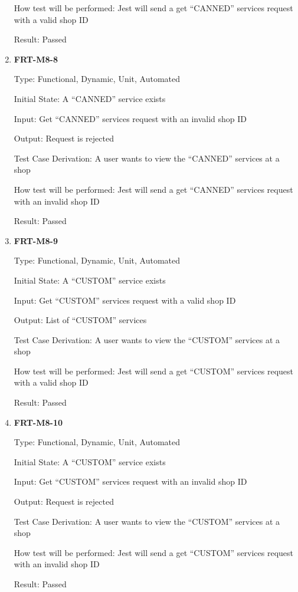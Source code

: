 \documentclass[12pt, titlepage]{article}
\begin{document}
\begin{enumerate}
	      How test will be performed: Jest will send a get ``CANNED'' services request with a valid shop ID

	      Result: Passed

	\item \textbf{FRT-M8-8}

	      Type: Functional, Dynamic, Unit, Automated

	      Initial State: A ``CANNED'' service exists

	      Input: Get ``CANNED'' services request with an invalid shop ID

	      Output: Request is rejected

	      Test Case Derivation: A user wants to view the ``CANNED'' services at a shop

	      How test will be performed: Jest will send a get ``CANNED'' services request with an invalid shop
	      ID

	      Result: Passed

	\item \textbf{FRT-M8-9}

	      Type: Functional, Dynamic, Unit, Automated

	      Initial State: A ``CUSTOM'' service exists

	      Input: Get ``CUSTOM'' services request with a valid shop ID

	      Output: List of ``CUSTOM'' services

	      Test Case Derivation: A user wants to view the ``CUSTOM'' services at a shop

	      How test will be performed: Jest will send a get ``CUSTOM'' services request with a valid shop ID

	      Result: Passed

	\item \textbf{FRT-M8-10}

	      Type: Functional, Dynamic, Unit, Automated

	      Initial State: A ``CUSTOM'' service exists

	      Input: Get ``CUSTOM'' services request with an invalid shop ID

	      Output: Request is rejected

	      Test Case Derivation: A user wants to view the ``CUSTOM'' services at a shop

	      How test will be performed: Jest will send a get ``CUSTOM'' services request with an invalid shop
	      ID

	      Result: Passed


\end{enumerate}
\end{document}
